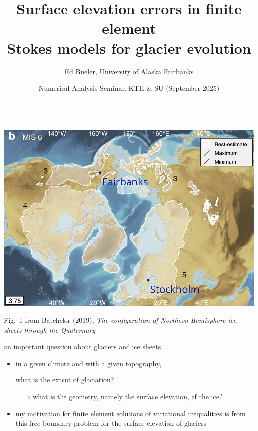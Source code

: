 \documentclass[10pt,svgnames]{beamer}
\title{Surface elevation errors in finite element \\ Stokes models for glacier evolution}
\date{Numerical Analysis Seminar, KTH \& SU (September 2025)}
\author{Ed Bueler, University of Alaska Fairbanks}
\begin{document}
\graphicspath{{figs/}{../../paper/figs/}}

\maketitle


\begin{frame}[plain]

\mbox{\hspace{-9mm} \includegraphics[width=1.15\textwidth]{nhsheets.png}}

\vspace{-2mm}
\hfill {\tiny Fig.~1 from Batchelor (2019), \emph{The configuration of Northern Hemisphere ice sheets through the Quaternary}}
\end{frame}


\begin{frame}{an important question about glaciers and ice sheets}

\begin{itemize}
\item in a given climate and with a given topography,

\begin{center}
\alert{what is the extent of glaciation?}
\end{center}

    \begin{itemize}
    \item[$\circ$] what is the \alert{geometry}, namely the surface elevation, of the ice?
    \end{itemize}

\bigskip
\item my motivation for \alert{finite element solutions of variational inequalities} is from this free-boundary problem for the surface elevation of glaciers
\end{itemize}
\end{frame}
\end{document}
